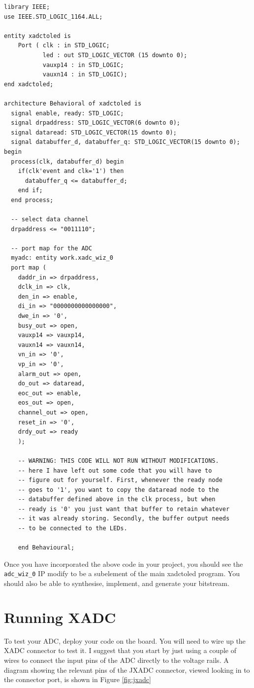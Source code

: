 \documentclass[../physical_computing.tex]{subfiles}
\begin{document}
\begin{verbatim}
library IEEE;
use IEEE.STD_LOGIC_1164.ALL;

entity xadctoled is
    Port ( clk : in STD_LOGIC;
           led : out STD_LOGIC_VECTOR (15 downto 0);
           vauxp14 : in STD_LOGIC;
           vauxn14 : in STD_LOGIC);
end xadctoled;

architecture Behavioral of xadctoled is
  signal enable, ready: STD_LOGIC;
  signal drpaddress: STD_LOGIC_VECTOR(6 downto 0);
  signal dataread: STD_LOGIC_VECTOR(15 downto 0);
  signal databuffer_d, databuffer_q: STD_LOGIC_VECTOR(15 downto 0);
begin
  process(clk, databuffer_d) begin
    if(clk'event and clk='1') then
      databuffer_q <= databuffer_d;
    end if;
  end process;
  
  -- select data channel
  drpaddress <= "0011110";
  
  -- port map for the ADC
  myadc: entity work.xadc_wiz_0
  port map (
    daddr_in => drpaddress,
    dclk_in => clk,
    den_in => enable,
    di_in => "0000000000000000",
    dwe_in => '0',
    busy_out => open,
    vauxp14 => vauxp14,
    vauxn14 => vauxn14,
    vn_in => '0',
    vp_in => '0',
    alarm_out => open,
    do_out => dataread,
    eoc_out => enable,
    eos_out => open,
    channel_out => open, 
    reset_in => '0',
    drdy_out => ready
    );
    
    -- WARNING: THIS CODE WILL NOT RUN WITHOUT MODIFICATIONS.
    -- here I have left out some code that you will have to
    -- figure out for yourself. First, whenever the ready node
    -- goes to '1', you want to copy the dataread node to the
    -- databuffer defined above in the clk process, but when
    -- ready is '0' you just want that buffer to retain whatever
    -- it was already storing. Secondly, the buffer output needs
    -- to be connected to the LEDs.
    
    end Behavioural;
\end{verbatim}

Once you have incorporated the above code in your project, you should see the \texttt{adc\_wiz\_0} IP modify to be a subelement of the main xadctoled program. You should also be able to synthesise, implement, and generate your bitstream.

\section{Running XADC}
\label{sec:runningxadc}

To test your ADC, deploy your code on the board. You will need to wire up the 
XADC connector to test it. I suggest that you start by just using a couple of wires to connect the input pins of the ADC directly to the voltage rails. A diagram showing the relevant pins of the JXADC connector, viewed looking in to the connector port, is shown in Figure \ref{fig:jxadc}
\end{document}
